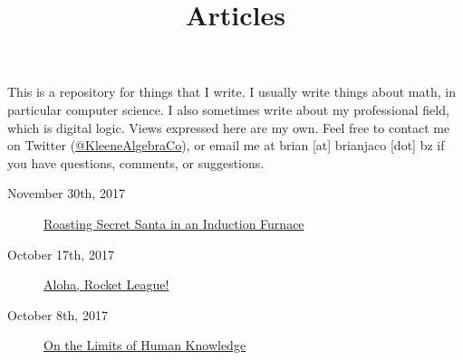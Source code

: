 \documentclass{article}
\title{Articles}
\date{}
\begin{document}
\maketitle

This is a repository for things that I write. I usually write things about math, in particular computer science. I also sometimes write about my professional field, which is digital logic. Views expressed here are my own. Feel free to contact me on Twitter (\href{https://twitter.com/KleeneAlgebraCo}{@KleeneAlgebraCo}), or email me at brian [at] brianjaco [dot] bz if you have questions, comments, or suggestions.

\begin{description}
\item[November 30th, 2017] \href{secret-santa/index.html}{Roasting Secret Santa in an Induction Furnace}
\item[October 17th, 2017] \href{aloha-rocket-league/index.html}{Aloha, Rocket League!}
\item[October 8th, 2017] \href{limits-of-human-knowledge/index.html}{On the Limits of Human Knowledge}
\end{description}
\end{document}
